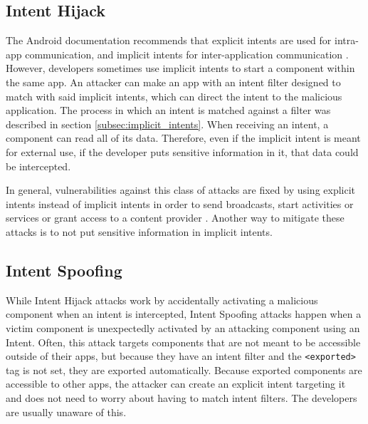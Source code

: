     \subsection{Intent Hijack}
        \label{subsec:intent_hijack}
        
    The Android documentation recommends that explicit intents are used for intra-app communication, and implicit intents for inter-application communication \cite{intents_and_intent_filters}. However, developers sometimes use implicit intents to start a component within the same app. An attacker can make an app with an intent filter designed to match with said implicit intents, which can direct the intent to the malicious application. The process in which an intent is matched against a filter was described in section \ref{subsec:implicit_intents}. When receiving an intent, a component can read all of its data. Therefore, even if the implicit intent is meant for external use, if the developer puts sensitive information in it, that data could be intercepted.
    
    In general, vulnerabilities against this class of attacks are fixed by using explicit intents instead of implicit intents in order to send broadcasts, start activities or services or grant access to a content provider \cite{2010_icc_paper}. Another way to mitigate these attacks is to not put sensitive information in implicit intents.
    
    \subsection{Intent Spoofing}
        \label{subsec:intent_spoofing}
        
    While Intent Hijack attacks work by accidentally activating a malicious component when an intent is intercepted, Intent Spoofing attacks happen when a victim component is unexpectedly activated by an attacking component using an Intent. Often, this attack targets components that are not meant to be accessible outside of their apps, but because they have an intent filter and the \lstinline|<exported>| tag is not set, they are exported automatically. Because exported components are accessible to other apps, the attacker can create an explicit intent targeting it and does not need to worry about having to match intent filters. The developers are usually unaware of this.
    

